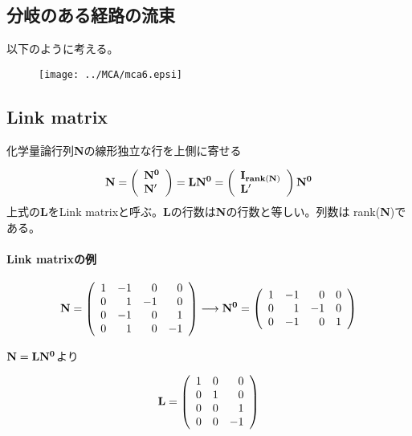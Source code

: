 \subsection{分岐のある経路の流束}
以下のように考える。
\begin{figure}[h]
\begin{center}
\texttt{[image: ../MCA/mca6.epsi]}
\end{center}
\end{figure}


\subsection{Link matrix}
化学量論行列{\bf N}の線形独立な行を上側に寄せる

\[
{\bf N}
=
\left(
\begin{array}{l}
{\bf N^0} \\
{\bf N^{\prime}}
\end{array}
\right)
=
{\bf LN^0}
=
\left(
\begin{array}{l}
{\bf I_{rank({\bf N})}} \\
{\bf L^{\prime}}
\end{array}
\right)
{\bf N^0}
\]
上式の{\bf L}をLink matrixと呼ぶ。{\bf L}の行数は{\bf N}の行数と等しい。列数は rank({\bf N})である。
\paragraph{Link matrixの例}
\[
{\bf N}
=
\left(
\begin{array}{rrrr}
1 & -1 & 0 & 0\\
0 & 1  & -1 & 0\\
0 & -1 & 0 & 1\\
0 & 1 & 0 & -1 \\
\end{array}
\right)
\longrightarrow
{\bf N^0}
=
\left(
\begin{array}{rrrr}
1 & -1 & 0 & 0\\
0 & 1  & -1 & 0\\
0 & -1 & 0 & 1\\
\end{array}
\right)
\]

\({\bf N = LN^0}\)より

\[
{\bf L}
=
\left(
\begin{array}{rrrr}
1 & 0 & 0\\
0 & 1 & 0\\
0 & 0 & 1\\
0 & 0 & -1\\
\end{array}
\right)
\]

